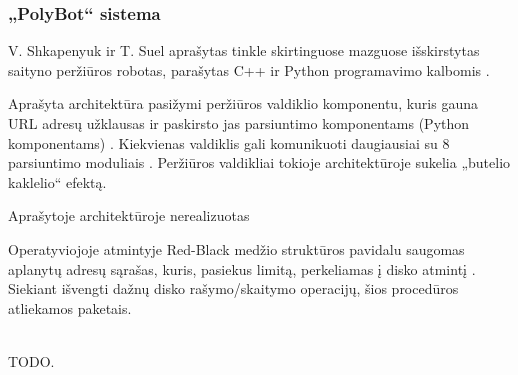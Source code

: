 \subsubsection{„PolyBot“ sistema}

V. Shkapenyuk ir T. Suel aprašytas tinkle skirtinguose mazguose išskirstytas saityno peržiūros robotas, parašytas C++ ir Python programavimo kalbomis \cite{PolyBotArchitecture}.


Aprašyta architektūra pasižymi peržiūros valdiklio komponentu, kuris gauna URL adresų užklausas ir paskirsto jas parsiuntimo komponentams (Python komponentams) \cite{PolyBotArchitecture}. Kiekvienas valdiklis gali komunikuoti daugiausiai su 8 parsiuntimo moduliais \cite{PolyBotArchitecture}. Peržiūros valdikliai tokioje architektūroje sukelia „butelio kaklelio“ efektą.


Aprašytoje architektūroje nerealizuotas


Operatyviojoje atmintyje Red-Black medžio struktūros pavidalu saugomas aplanytų adresų sąrašas, kuris, pasiekus limitą, perkeliamas į disko atmintį \cite{PolyBotArchitecture}. Siekiant išvengti dažnų disko rašymo/skaitymo operacijų, šios procedūros atliekamos paketais.

\\ TODO.


